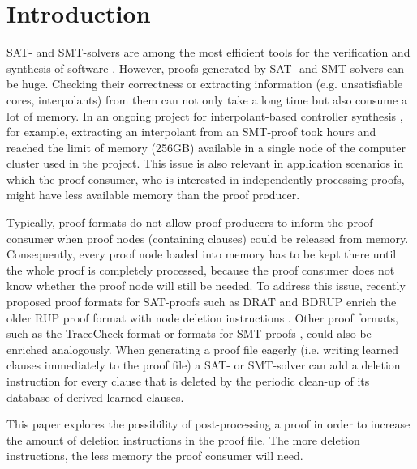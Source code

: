 \section{Introduction}

SAT- and SMT-solvers are among the most efficient tools for the verification and synthesis of software \cite{Hofferek2013}. 
However, proofs generated by SAT- and SMT-solvers can be huge. 
Checking their correctness or extracting information (e.g. unsatisfiable cores, interpolants) from them can not only take a long time but also consume a lot of memory. 
In an ongoing project for interpolant-based controller synthesis \cite{Hofferek2013}, 
for example, extracting an interpolant from an SMT-proof took hours and reached the limit of memory (256GB) available in a single node of the computer cluster used in the project. This issue is also relevant in application scenarios in which the proof consumer, who is interested in independently processing proofs, might have less available memory than the proof producer.

Typically, proof formats do not allow proof producers to inform the proof consumer when proof nodes (containing clauses) could be released from memory. Consequently, every proof node loaded into memory has to be kept there until the whole proof is completely processed, because the proof consumer does not know whether the proof node will still be needed. To address this issue, recently proposed proof formats for SAT-proofs such as DRAT and BDRUP enrich the older RUP proof format with node deletion instructions \cite{raey}. Other proof formats, such as the TraceCheck format \cite{BiereHeuleAPPA} or formats for SMT-proofs \cite{BarrettFontaineMouraAPPA}, could also be enriched analogously. When generating a proof file eagerly (i.e. writing learned clauses immediately to the proof file) a SAT- or SMT-solver can add a deletion instruction for every clause that is deleted by the periodic clean-up of its database of derived learned clauses.

This paper explores the possibility of post-processing a proof in order to increase the amount of deletion instructions in the proof file. The more deletion instructions, the less memory the proof consumer will need. 


